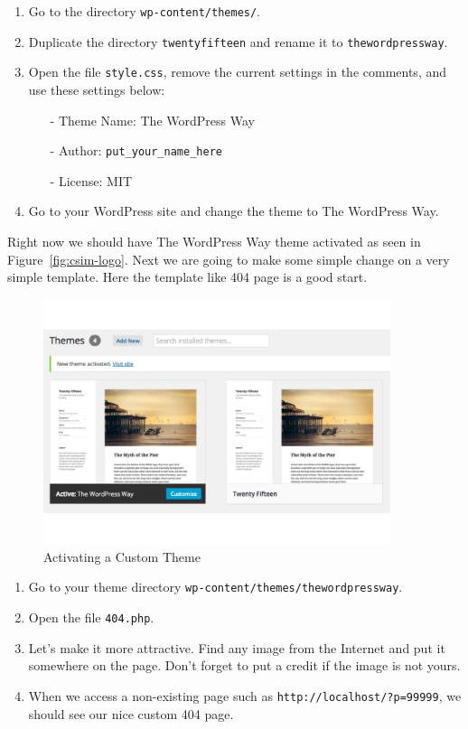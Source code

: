 \documentclass{article}
\begin{document}
\begin{enumerate}
    \item Go to the directory {\tt wp-content/themes/}.
    \item Duplicate the directory {\tt twentyfifteen} and rename it
        to {\tt thewordpressway}.
    \item Open the file {\tt style.css}, remove the current settings in the
        comments, and use these settings below:
        \begin{itemize}
            \item[-] Theme Name: The WordPress Way
            \item[-] Author: {\tt put\_your\_name\_here}
            \item[-] License: MIT
        \end{itemize}
    \item Go to your WordPress site and change the theme to The WordPress Way.
\end{enumerate}

\noindent Right now we should have The WordPress Way theme activated as seen in
Figure~\ref{fig:csim-logo}. Next we are going to make some simple change on a
very simple template. Here the template like 404 page is a good start.

\FloatBarrier

\begin{figure}[t]
    \centering
    \includegraphics[width=4in]{figures/activating-custom-theme}
    \caption{Activating a Custom Theme}
    \label{fig:activating-custom-theme}
\end{figure}

\begin{enumerate}
    \item Go to your theme directory {\tt wp-content/themes/thewordpressway}.
    \item Open the file {\tt 404.php}.
    \item Let's make it more attractive. Find any image from the Internet and
        put it somewhere on the page. Don't forget to put a credit if the
        image is not yours.
    \item When we access a non-existing page such as
        {\tt http://localhost/?p=99999}, we should see our nice custom
        404 page.
\end{enumerate}
\end{document}
